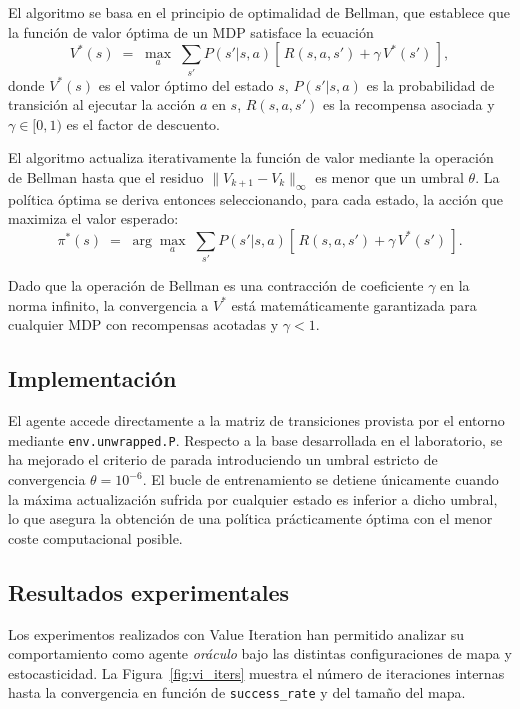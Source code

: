 \documentclass[11pt,a4paper]{article}
\begin{document}
El algoritmo se basa en el principio de optimalidad de Bellman, que establece que la función de valor óptima de un MDP satisface la ecuación
\begin{equation}
  V^{\ast}(s) \;=\; \max_{a}\; \sum_{s'} P(s'|s,a)\!\left[\,R(s,a,s') + \gamma\, V^{\ast}(s')\,\right],
  \label{eq:bellman}
\end{equation}
donde $V^{\ast}(s)$ es el valor óptimo del estado $s$, $P(s'|s,a)$ es la probabilidad de transición al ejecutar la acción $a$ en $s$, $R(s,a,s')$ es la recompensa asociada y $\gamma\in[0,1)$ es el factor de descuento.

El algoritmo actualiza iterativamente la función de valor mediante la operación de Bellman hasta que el residuo $\lVert V_{k+1}-V_k\rVert_\infty$ es menor que un umbral $\theta$. La política óptima se deriva entonces seleccionando, para cada estado, la acción que maximiza el valor esperado:
\begin{equation}
  \pi^{\ast}(s) \;=\; \arg\max_{a}\; \sum_{s'} P(s'|s,a)\!\left[\,R(s,a,s') + \gamma\, V^{\ast}(s')\,\right].
  \label{eq:greedy}
\end{equation}

Dado que la operación de Bellman es una contracción de coeficiente $\gamma$ en la norma infinito, la convergencia a $V^{\ast}$ está matemáticamente garantizada para cualquier MDP con recompensas acotadas y $\gamma<1$.

\subsection{Implementación}

El agente accede directamente a la matriz de transiciones provista por el entorno mediante \texttt{env.unwrapped.P}. Respecto a la base desarrollada en el laboratorio, se ha mejorado el criterio de parada introduciendo un umbral estricto de convergencia $\theta = 10^{-6}$. El bucle de entrenamiento se detiene únicamente cuando la máxima actualización sufrida por cualquier estado es inferior a dicho umbral, lo que asegura la obtención de una política prácticamente óptima con el menor coste computacional posible.

\subsection{Resultados experimentales}

Los experimentos realizados con Value Iteration han permitido analizar su comportamiento como agente \emph{oráculo} bajo las distintas configuraciones de mapa y estocasticidad. La Figura~\ref{fig:vi_iters} muestra el número de iteraciones internas hasta la convergencia en función de \texttt{success\_rate} y del tamaño del mapa.
\end{document}
